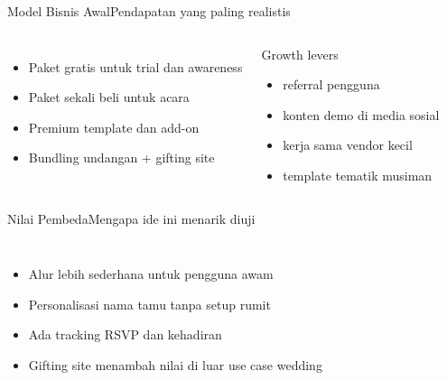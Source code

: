 \documentclass[aspectratio=169,11pt]{beamer}
\begin{document}
\begin{frame}{Model Bisnis Awal}{Pendapatan yang paling realistis}
\begin{columns}[T,totalwidth=\textwidth]
\begin{itemize}
  \item Paket gratis untuk trial dan awareness
  \item Paket sekali beli untuk acara
  \item Premium template dan add-on
  \item Bundling undangan + gifting site
\end{itemize}

\begin{block}{Growth levers}
\begin{itemize}
  \item referral pengguna
  \item konten demo di media sosial
  \item kerja sama vendor kecil
  \item template tematik musiman
\end{itemize}
\end{block}
\end{columns}
\end{frame}

\begin{frame}{Nilai Pembeda}{Mengapa ide ini menarik diuji}
\begin{columns}[T,totalwidth=\textwidth]
\begin{itemize}
  \item Alur lebih sederhana untuk pengguna awam
  \item Personalisasi nama tamu tanpa setup rumit
  \item Ada tracking RSVP dan kehadiran
  \item Gifting site menambah nilai di luar use case wedding
\end{itemize}

\end{columns}
\end{frame}
\end{document}
